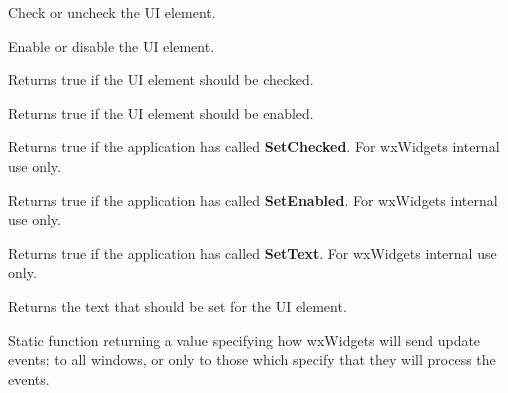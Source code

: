\label{wxupdateuieventcheck}


Check or uncheck the UI element.

\label{wxupdateuieventenable}


Enable or disable the UI element.

\label{wxupdateuieventgetchecked}


Returns true if the UI element should be checked.

\label{wxupdateuieventgetenabled}


Returns true if the UI element should be enabled.

\label{wxupdateuieventgetsetchecked}


Returns true if the application has called {\bf SetChecked}. For wxWidgets internal use only.

\label{wxupdateuieventgetsetenabled}


Returns true if the application has called {\bf SetEnabled}. For wxWidgets internal use only.

\label{wxupdateuieventgetsettext}


Returns true if the application has called {\bf SetText}. For wxWidgets internal use only.

\label{wxupdateuieventgettext}


Returns the text that should be set for the UI element.

\label{wxupdateuieventgetmode}


Static function returning a value specifying how wxWidgets
will send update events: to all windows, or only to those which specify that they
will process the events.

